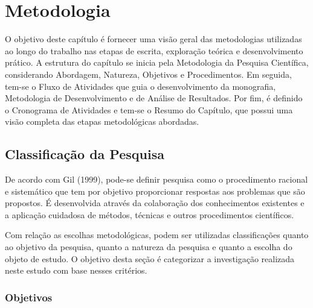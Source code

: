 \chapter[Metodologia]{Metodologia}
O objetivo deste capítulo é fornecer uma visão geral das metodologias utilizadas ao longo do trabalho nas etapas de escrita, exploração teórica e desenvolvimento prático. 
A estrutura do capítulo se inicia pela Metodologia da Pesquisa Científica, considerando Abordagem, Natureza, Objetivos e Procedimentos. Em seguida, tem-se o Fluxo de Atividades que guia o desenvolvimento  
da monografia, Metodologia de Desenvolvimento e de Análise de Resultados. Por fim, é definido o Cronograma de Atividades e tem-se o Resumo do Capítulo, que possui uma visão completa das etapas 
metodológicas abordadas.

\section{Classificação da Pesquisa}
\label{sec:Classificação da Pesquisa}
De acordo com Gil (1999), pode-se definir pesquisa como o procedimento racional e sistemático que tem por objetivo proporcionar respostas aos problemas que são propostos. É desenvolvida através da colaboração 
dos conhecimentos existentes e a aplicação cuidadosa de métodos, técnicas e outros procedimentos científicos.

Com relação as escolhas metodológicas, podem ser utilizadas classificações quanto ao objetivo da pesquisa, quanto a natureza da pesquisa e quanto a escolha do objeto de estudo. O objetivo desta seção é 
categorizar a investigação realizada neste estudo com base nesses critérios.

\subsection{Objetivos}
\label{sec:Objetivos}
